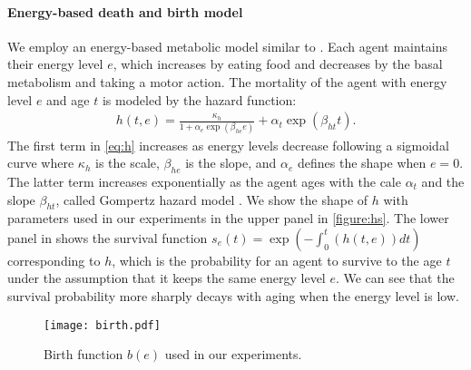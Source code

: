 \paragraph{Energy-based death and birth model}
We employ an energy-based metabolic model similar to \citet{hamonEcoevolutionaryDynamicsNonepisodic2023}. Each agent maintains their energy level $e$, which increases by eating food and decreases by the basal metabolism and taking a motor action.
The mortality of the agent with energy level $e$ and age $t$ is modeled by the hazard function:
\begin{align}
  h(t, e) = \frac{\kappa_{h}}{1 + \alpha_{e}\exp(\beta_{he}e)} + \alpha_{t} \exp(\beta_{ht} t).
  \label{eq:h}
\end{align}
The first term in \cref{eq:h} increases as energy levels decrease following a sigmoidal curve where $\kappa_{h}$ is the scale, $\beta_{he}$ is the slope, and $\alpha_{e}$ defines the shape when $e=0$. The latter term increases exponentially as the agent ages with the cale $\alpha_{t}$ and the slope $\beta_{ht}$, called Gompertz hazard model \citep{gompertzXXIVNatureFunction1825,kirkwoodDecipheringDeathCommentary2015}.
We show the shape of $h$ with parameters used in our experiments in the upper panel in \cref{figure:hs}. The lower panel in  shows the survival function $s_{e}(t) = \exp (-\int_{0}^{t}(h(t, e)) dt)$ corresponding to $h$, which is the probability for an agent to survive to the age $t$ under the assumption that it keeps the same energy level $e$. We can see that the survival probability more sharply decays with aging when the energy level is low.

\begin{figure}[t]
  \centering{}
  \texttt{[image: birth.pdf]}
  \caption{Birth function $b(e)$ used in our experiments.}\label{figure:birth}
\end{figure}

